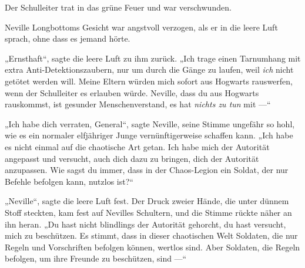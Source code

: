 Der Schulleiter trat in das grüne Feuer und war verschwunden.


Neville Longbottoms Gesicht war angstvoll verzogen, als er in die leere Luft sprach, ohne dass es jemand hörte.

„Ernsthaft“, sagte die leere Luft zu ihm zurück.
„Ich trage einen Tarnumhang mit extra Anti-Detektionszaubern, nur um durch die Gänge zu laufen, weil \emph{ich} nicht getötet werden will. Meine Eltern würden mich sofort aus Hogwarts rauswerfen, wenn der Schulleiter es erlauben würde. Neville, dass du aus Hogwarts rauskommst, ist gesunder Menschenverstand, es hat \emph{nichts zu tun} mit —“

„Ich habe dich verraten, General“, sagte Neville, seine Stimme ungefähr so hohl, wie es ein normaler elfjähriger Junge vernünftigerweise schaffen kann.
„Ich habe es nicht einmal auf die chaotische Art getan. Ich habe mich der Autorität angepasst und versucht, auch dich dazu zu bringen, dich der Autorität anzupassen. Wie sagst du immer, dass in der Chaos-Legion ein Soldat, der nur Befehle befolgen kann, nutzlos ist?“

„Neville“, sagte die leere Luft fest. Der Druck zweier Hände, die unter dünnem Stoff steckten, kam fest auf Nevilles Schultern, und die Stimme rückte näher an ihn heran.
„Du hast nicht blindlings der Autorität gehorcht, du hast versucht, mich zu beschützen. Es stimmt, dass in dieser chaotischen Welt Soldaten, die nur Regeln und Vorschriften befolgen können, wertlos sind. Aber Soldaten, die Regeln befolgen, um ihre Freunde zu beschützen, sind —“

